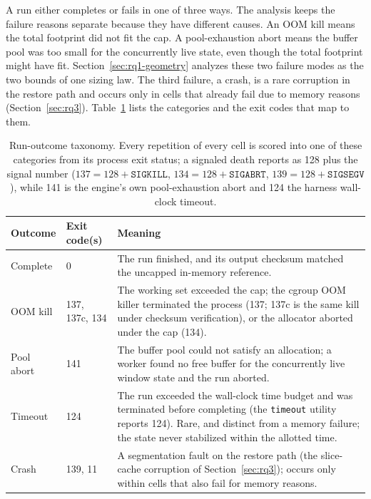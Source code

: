 A run either completes or fails in one of three ways.
The analysis keeps the failure reasons separate because they have different causes.
An OOM kill means the total footprint did not fit the cap.
A pool-exhaustion abort means the buffer pool was too small for the concurrently live state, even though the total footprint might have fit.
Section~\ref{sec:rq1-geometry} analyzes these two failure modes as the two bounds of one sizing law.
The third failure, a crash, is a rare corruption in the restore path and occurs only in cells that already fail due to memory reasons (Section~\ref{sec:rq3}).
Table~\ref{tab:outcomes} lists the categories and the exit codes that map to them.

\begin{table}[ht]
\centering
\small
\begin{tabular}{|l|l|>{\raggedright\arraybackslash}p{6.9cm}|}
\hline
\textbf{Outcome} & \textbf{Exit code(s)} & \textbf{Meaning} \\
\hline
Complete & 0 & The run finished, and its output checksum matched the uncapped in-memory reference. \\
\hline
OOM kill & 137, 137c, 134 & The working set exceeded the cap; the cgroup OOM killer terminated the process (137; 137c is the same kill under checksum verification), or the allocator aborted under the cap (134). \\
\hline
Pool abort & 141 & The buffer pool could not satisfy an allocation; a worker found no free buffer for the concurrently live window state and the run aborted. \\
\hline
Timeout & 124 & The run exceeded the wall-clock time budget and was terminated before completing (the \texttt{timeout} utility reports 124). Rare, and distinct from a memory failure; the state never stabilized within the allotted time. \\
\hline
Crash & 139, 11 & A segmentation fault on the restore path (the slice-cache corruption of Section~\ref{sec:rq3}); occurs only within cells that also fail for memory reasons. \\
\hline
\end{tabular}
\caption[Run-outcome taxonomy]{Run-outcome taxonomy. Every repetition of every cell is scored into one
of these categories from its process exit status; a signaled death reports as
128 plus the signal number ($137 = 128 + \texttt{SIGKILL}$,
$134 = 128 + \texttt{SIGABRT}$, $139 = 128 + \texttt{SIGSEGV}$), while 141 is the
engine's own pool-exhaustion abort and 124 the harness wall-clock timeout.}
\label{tab:outcomes}
\end{table}

